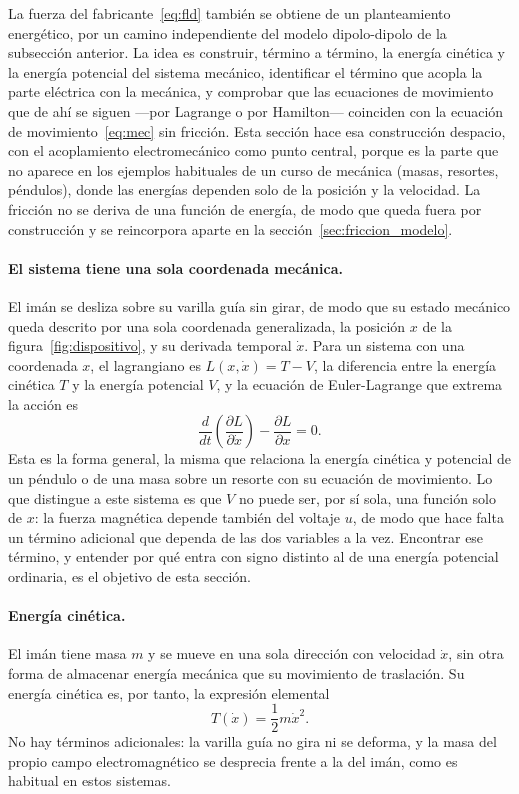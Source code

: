 La fuerza del fabricante~\eqref{eq:fld} también se obtiene de un planteamiento energético, por un camino independiente del modelo dipolo-dipolo de la subsección anterior. La idea es construir, término a término, la energía cinética y la energía potencial del sistema mecánico, identificar el término que acopla la parte eléctrica con la mecánica, y comprobar que las ecuaciones de movimiento que de ahí se siguen —por Lagrange o por Hamilton— coinciden con la ecuación de movimiento~\eqref{eq:mec} sin fricción. Esta sección hace esa construcción despacio, con el acoplamiento electromecánico como punto central, porque es la parte que no aparece en los ejemplos habituales de un curso de mecánica (masas, resortes, péndulos), donde las energías dependen solo de la posición y la velocidad. La fricción no se deriva de una función de energía, de modo que queda fuera por construcción y se reincorpora aparte en la sección~\ref{sec:friccion_modelo}.

\paragraph{El sistema tiene una sola coordenada mecánica.}
El imán se desliza sobre su varilla guía sin girar, de modo que su estado mecánico queda descrito por una sola coordenada generalizada, la posición $x$ de la figura~\ref{fig:dispositivo}, y su derivada temporal $\dot{x}$. Para un sistema con una coordenada $x$, el lagrangiano es $L(x,\dot{x})=T-V$, la diferencia entre la energía cinética $T$ y la energía potencial $V$, y la ecuación de Euler-Lagrange que extrema la acción es
\begin{equation}
\frac{d}{dt}\left(\frac{\partial L}{\partial \dot{x}}\right) - \frac{\partial L}{\partial x} = 0 .
\label{eq:euler_lagrange}
\end{equation}
Esta es la forma general, la misma que relaciona la energía cinética y potencial de un péndulo o de una masa sobre un resorte con su ecuación de movimiento. Lo que distingue a este sistema es que $V$ no puede ser, por sí sola, una función solo de $x$: la fuerza magnética depende también del voltaje $u$, de modo que hace falta un término adicional que dependa de las dos variables a la vez. Encontrar ese término, y entender por qué entra con signo distinto al de una energía potencial ordinaria, es el objetivo de esta sección.

\paragraph{Energía cinética.}
El imán tiene masa $m$ y se mueve en una sola dirección con velocidad $\dot{x}$, sin otra forma de almacenar energía mecánica que su movimiento de traslación. Su energía cinética es, por tanto, la expresión elemental
\begin{equation}
T(\dot{x}) = \frac{1}{2}m\dot{x}^2 .
\label{eq:cinetica_cap3}
\end{equation}
No hay términos adicionales: la varilla guía no gira ni se deforma, y la masa del propio campo electromagnético se desprecia frente a la del imán, como es habitual en estos sistemas.

